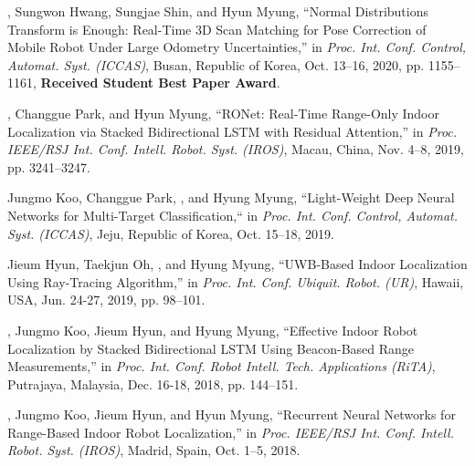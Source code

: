 \begin{pubSubsectionNum}
    \item \hyungtaelim, Sungwon Hwang, Sungjae Shin, and Hyun Myung, ``Normal Distributions Transform is Enough: Real-Time 3D Scan Matching for Pose Correction of Mobile Robot Under Large Odometry Uncertainties,'' in \textit{Proc. Int. Conf. Control, Automat. Syst. (ICCAS)}, Busan, Republic of Korea, Oct. 13--16, 2020, pp. 1155--1161, \textbf{Received Student Best Paper Award}.
    \item \hyungtaelim, Changgue Park, and Hyun Myung, ``RONet: Real-Time Range-Only Indoor Localization via Stacked Bidirectional LSTM with Residual Attention,'' in \textit{Proc. IEEE/RSJ Int. Conf. Intell. Robot. Syst. (IROS)}, Macau, China, Nov. 4--8, 2019, pp. 3241--3247.
    \item Jungmo Koo, Changgue Park, \hyungtaelim, and Hyung Myung, ``Light-Weight Deep Neural Networks for Multi-Target Classification,`` in \textit{Proc. Int. Conf. Control, Automat. Syst. (ICCAS)}, Jeju, Republic of Korea, Oct. 15--18, 2019.
    \item Jieum Hyun, Taekjun Oh, \hyungtaelim, and Hyung Myung, ``UWB-Based Indoor Localization Using Ray-Tracing Algorithm,'' in \textit{Proc. Int. Conf. Ubiquit. Robot. (UR)}, Hawaii, USA, Jun. 24-27, 2019, pp. 98--101.
    \item \hyungtaelim, Jungmo Koo, Jieum Hyun, and Hyung Myung, ``Effective Indoor Robot Localization by Stacked Bidirectional LSTM Using Beacon-Based Range Measurements,'' in \textit{Proc. Int. Conf. Robot Intell. Tech. Applications (RiTA)}, Putrajaya, Malaysia, Dec. 16-18, 2018, pp. 144--151.
    \item \hyungtaelim, Jungmo Koo, Jieum Hyun, and Hyun Myung, ``Recurrent Neural Networks for Range-Based Indoor Robot Localization,'' in \textit{Proc. IEEE/RSJ Int. Conf. Intell. Robot. Syst. (IROS)}, Madrid, Spain, Oct. 1--5, 2018.
\end{pubSubsectionNum}

%

